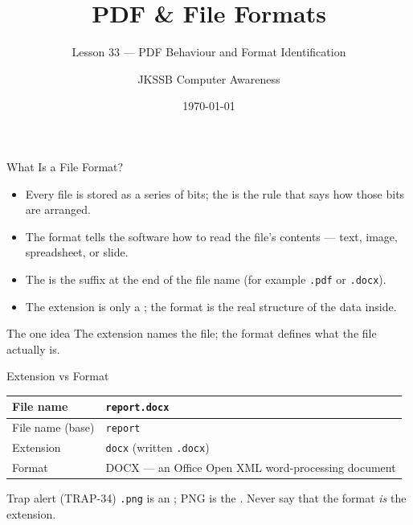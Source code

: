 \documentclass[aspectratio=169]{beamer}
\title{PDF \& File Formats}
\subtitle{Lesson 33 --- PDF Behaviour and Format Identification}
\author{JKSSB Computer Awareness}
\date{\today}
\begin{document}
\frame{\titlepage}

\begin{frame}{What Is a File Format?}
  \begin{itemize}
    \item Every file is stored as a series of bits; the 
      is the rule that says how those bits are arranged.
    \item The format tells the software how to read the file's contents ---
      text, image, spreadsheet, or slide.
    \item The  is the suffix at the end of the file name
      (for example \texttt{.pdf} or \texttt{.docx}).
    \item The extension is only a ; the format is the real
      structure of the data inside.
  \end{itemize}
  \begin{block}{The one idea}
    The extension names the file; the format defines what the file actually is.
  \end{block}
\end{frame}

\begin{frame}{Extension vs Format}
  \begin{center}
    \begin{tabular}{p{}p{}}
      \toprule
      \textbf{File name} & \texttt{report.docx} \\
      \midrule
      File name (base) & \texttt{report} \\
      Extension & \texttt{docx} (written \texttt{.docx}) \\
      Format & DOCX --- an Office Open XML word-processing document \\
      \bottomrule
    \end{tabular}
  \end{center}
  \vspace{0.3cm}
  \begin{alertblock}{Trap alert (TRAP-34)}
    \texttt{.png} is an ; PNG is the . Never say
    that the format \emph{is} the extension.
  \end{alertblock}
\end{frame}
\end{document}
